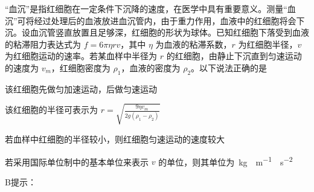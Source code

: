 “血沉”是指红细胞在一定条件下沉降的速度，在医学中具有重要意义。测量“血沉”可将经过处理后的血液放进血沉管内，由于重力作用，血液中的红细胞将会下沉。设血沉管竖直放置且足够深，红细胞的形状为球体。已知红细胞下落受到血液的粘滞阻力表达式为 \(f = 6\pi \eta r v\)，其中 \(\eta\) 为血液的粘滞系数，\(r\) 为红细胞半径，\(v\) 为红细胞运动的速率。若某血样中半径为 \(r\) 的红细胞，由静止下沉直到匀速运动的速度为 \(v_m\)，红细胞密度为 \(\rho_1\)，血液的密度为 \(\rho_2\)。以下说法正确的是\paren[]
\begin{choices}
	\item 该红细胞先做匀加速运动，后做匀速运动
	\item 该红细胞的半径可表示为 \(r = \sqrt{\frac{9\eta v_m}{2g(\rho_1 - \rho_2)}}\)
	\item 若血样中红细胞的半径较小，则红细胞匀速运动的速度较大
	\item 若采用国际单位制中的基本单位来表示 \(v\) 的单位，则其单位为\qty{}{kg\cdot m^{-1}\cdot s^{-2}}
\end{choices}
\begin{answer}
    B\qquad 提示：
\end{answer}